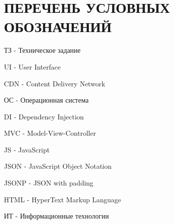 \section*{ПЕРЕЧЕНЬ УСЛОВНЫХ ОБОЗНАЧЕНИЙ}

ТЗ - Техническое задание

UI - User Interface

CDN - Content Delivery Network

ОС - Операционная система

DI - Dependency Injection

MVC - Model-View-Controller

JS - JavaScript

JSON - JavaScript Object Notation

JSONP - JSON with padding

HTML - HyperText Markup Language

ИТ - Информационные технологии

